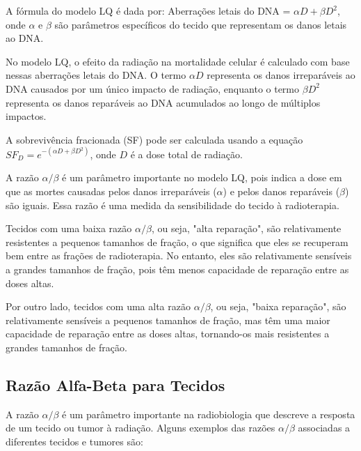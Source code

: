 \documentclass[11pt,a4paper]{article}
\newcounter{exemplo}
\begin{document}
	A fórmula do modelo LQ é dada por: Aberrações letais do DNA = $\alpha D + \beta D^2$, onde $\alpha$ e $\beta$ são parâmetros específicos do tecido que representam os danos letais ao DNA.

	No modelo LQ, o efeito da radiação na mortalidade celular é calculado com base nessas aberrações letais do DNA. O termo $\alpha D$ representa os danos irreparáveis ao DNA causados por um único impacto de radiação, enquanto o termo $\beta D^2$ representa os danos reparáveis ao DNA acumulados ao longo de múltiplos impactos.

	A sobrevivência fracionada (SF) pode ser calculada usando a equação $SF_D = e^{-({\alpha D + \beta D^2})}$, onde $D$ é a dose total de radiação.

	A razão $\alpha/\beta$ é um parâmetro importante no modelo LQ, pois indica a dose em que as mortes causadas pelos danos irreparáveis ($\alpha$) e pelos danos reparáveis ($\beta$) são iguais. Essa razão é uma medida da sensibilidade do tecido à radioterapia.

	Tecidos com uma baixa razão $\alpha/\beta$, ou seja, "alta reparação", são relativamente resistentes a pequenos tamanhos de fração, o que significa que eles se recuperam bem entre as frações de radioterapia. No entanto, eles são relativamente sensíveis a grandes tamanhos de fração, pois têm menos capacidade de reparação entre as doses altas.

	Por outro lado, tecidos com uma alta razão $\alpha/\beta$, ou seja, "baixa reparação", são relativamente sensíveis a pequenos tamanhos de fração, mas têm uma maior capacidade de reparação entre as doses altas, tornando-os mais resistentes a grandes tamanhos de fração.

\subsection*{Razão Alfa-Beta para Tecidos}

	A razão $\alpha/\beta$ é um parâmetro importante na radiobiologia que descreve a resposta de um tecido ou tumor à radiação. Alguns exemplos das razões $\alpha/\beta$ associadas a diferentes tecidos e tumores são:
\end{document}
